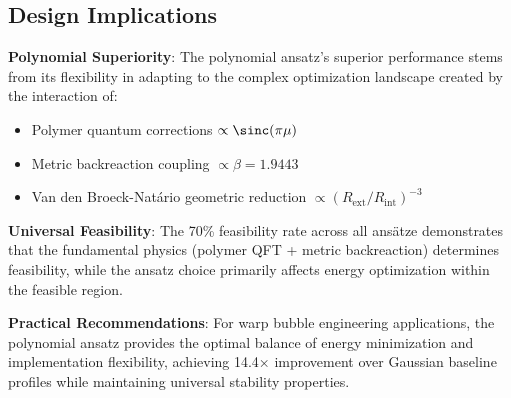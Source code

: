 \documentclass[12pt,a4paper]{article}
\begin{document}
\subsection{Design Implications}

\textbf{Polynomial Superiority}: The polynomial ansatz's superior performance stems from its flexibility in adapting to the complex optimization landscape created by the interaction of:
\begin{itemize}
\item Polymer quantum corrections $\propto \sinc(\pi\mu)$
\item Metric backreaction coupling $\propto \beta = 1.9443$
\item Van den Broeck-Natário geometric reduction $\propto (R_{\text{ext}}/R_{\text{int}})^{-3}$
\end{itemize}

\textbf{Universal Feasibility}: The 70\% feasibility rate across all ansätze demonstrates that the fundamental physics (polymer QFT + metric backreaction) determines feasibility, while the ansatz choice primarily affects energy optimization within the feasible region.

\textbf{Practical Recommendations}: For warp bubble engineering applications, the polynomial ansatz provides the optimal balance of energy minimization and implementation flexibility, achieving 14.4× improvement over Gaussian baseline profiles while maintaining universal stability properties.
\end{document}
